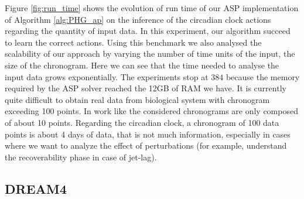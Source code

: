 Figure \ref{fig:run_time} shows the evolution of run time of our ASP implementation of Algorithm \ref{alg:PHG_ap} on the inference of the circadian clock actions regarding the quantity of input data.
In this experiment, our algorithm succeed to learn the correct actions.
Using this benchmark we also analysed the scalability of our approach by varying the number of time units of the input, \ie the size of the chronogram.
Here we can see that the time needed to analyse the input data grows exponentially.
The experiments stop at $384$ because the memory required by the ASP solver reached the 12GB of RAM we have.
It is currently quite difficult to obtain real data from biological system with chronogram exceeding 100 points.
In work like \cite{Fippo14} the considered chronograms are only composed of about 10 points.
Regarding the circadian clock, a chronogram of 100 data points is about 4 days of data, that is not much information, especially in cases where we want to analyze the effect of perturbations (for example, understand the recoverability phase in case of jet-lag). 

\subsection{DREAM4}
	
